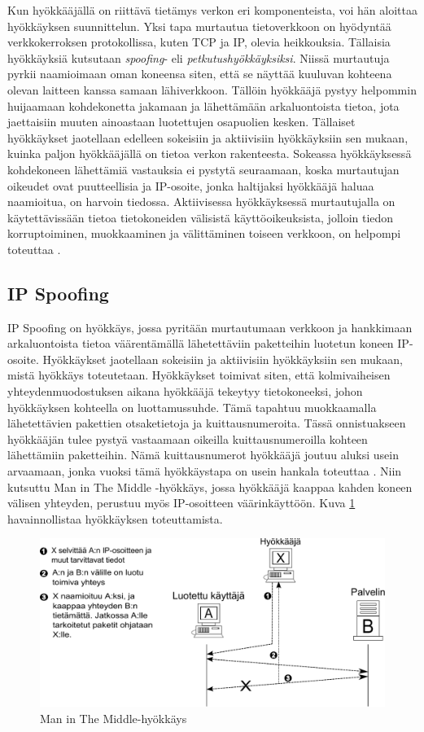 Kun hyökkääjällä on riittävä tietämys verkon eri komponenteista, voi
hän aloittaa hyökkäyksen suunnittelun. Yksi tapa murtautua
tietoverkkoon on hyödyntää verkkokerroksen protokollissa, kuten TCP ja
IP, olevia heikkouksia. Tällaisia hyökkäyksiä kutsutaan
\textit{spoofing}- eli \textit{petkutushyökkäyksiksi}. Niissä
murtautuja pyrkii naamioimaan oman koneensa siten, että se näyttää
kuuluvan kohteena olevan laitteen kanssa samaan lähiverkkoon.  Tällöin
hyökkääjä pystyy helpommin huijaamaan kohdekonetta jakamaan ja
lähettämään arkaluontoista tietoa, jota jaettaisiin muuten ainoastaan
luotettujen osapuolien kesken.  Tällaiset hyökkäykset jaotellaan
edelleen sokeisiin ja aktiivisiin hyökkäyksiin sen mukaan, kuinka
paljon hyökkääjällä on tietoa verkon rakenteesta. Sokeassa
hyökkäyksessä kohdekoneen lähettämiä vastauksia ei pystytä seuraamaan,
koska murtautujan oikeudet ovat puutteellisia ja IP-osoite, jonka
haltijaksi hyökkääjä haluaa naamioitua, on harvoin tiedossa.
Aktiivisessa hyökkäyksessä murtautujalla on käytettävissään tietoa
tietokoneiden välisistä käyttöoikeuksista, jolloin tiedon
korruptoiminen, muokkaaminen ja välittäminen toiseen verkkoon, on
helpompi toteuttaa \cite{WEBS}.

\subsection{IP Spoofing}

IP Spoofing on hyökkäys, jossa pyritään murtautumaan verkkoon ja
hankkimaan arkaluontoista tietoa väärentämällä lähetettäviin
paketteihin luotetun koneen IP-osoite. Hyökkäykset jaotellaan
sokeisiin ja aktiivisiin hyökkäyksiin sen mukaan, mistä hyökkäys
toteutetaan. Hyökkäykset toimivat siten, että kolmivaiheisen
yhteydenmuodostuksen aikana hyökkääjä tekeytyy tietokoneeksi, johon
hyökkäyksen kohteella on luottamussuhde. Tämä tapahtuu muokkaamalla
lähetettävien pakettien otsaketietoja ja kuittausnumeroita. Tässä
onnistuakseen hyökkääjän tulee pystyä vastaamaan oikeilla
kuittausnumeroilla kohteen lähettämiin paketteihin. Nämä
kuittausnumerot hyökkääjä joutuu aluksi usein arvaamaan, jonka vuoksi
tämä hyökkäystapa on usein hankala toteuttaa \cite{WEBS}. Niin kutsuttu Man
in The Middle -hyökkäys, jossa hyökkääjä kaappaa kahden koneen välisen
yhteyden, perustuu myös IP-\-osoitteen väärinkäyttöön. Kuva \ref{Man}
havainnollistaa hyökkäyksen toteuttamista.

\begin{figure}[ht]
\centering
\includegraphics[width=13cm]{pics/MiTM.pdf}
\caption{Man in The Middle-hyökkäys}
\label{Man}
\end{figure}

